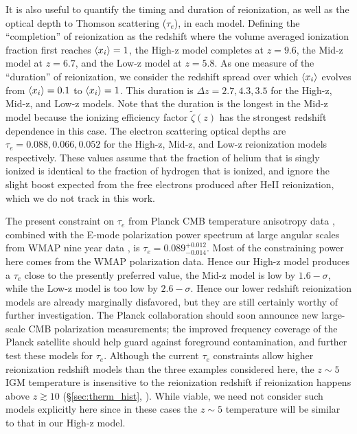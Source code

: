 It is also useful to quantify the timing and duration of reionization, as well as the optical depth to Thomson scattering ($\tau_e$), in each model. 
Defining the ``completion'' of reionization as the redshift where the volume averaged ionization fraction first reaches $\langle x_i \rangle =1$,
the High-z model completes at $z=9.6$,
the Mid-z model at $z=6.7$, and the Low-z model at $z=5.8$. As one measure of the ``duration'' of reionization, we consider the redshift spread over which $\langle x_i \rangle$ evolves from
$\langle x_i \rangle=0.1$ to $\langle x_i \rangle = 1$. This duration is $\Delta z = 2.7, 4.3, 3.5$ for the High-z, Mid-z, and Low-z models. Note that the duration
is the longest in the Mid-z model because the ionizing efficiency factor $\tilde{\zeta}(z)$ has the strongest redshift dependence in this case. 
The electron scattering optical depths are $\tau_e = 0.088, 0.066, 0.052$ for the High-z, Mid-z, and Low-z reionization
models respectively. These values assume that the fraction of helium that is singly ionized is identical to the fraction of hydrogen that
is ionized, and ignore the slight boost expected from the free
electrons produced after HeII reionization, which we do not track in this work. 

The present constraint on $\tau_e$ from Planck CMB temperature anisotropy data \citep{Ade:2013zuv}, combined with the E-mode polarization power spectrum
at large angular scales from WMAP nine year data \citep{Bennett:2012zja}, is $\tau_e = 0.089^{+0.012}_{-0.014}$. Most of the constraining power here
comes from the WMAP polarization data. Hence our High-z model produces a $\tau_e$ close to the presently preferred value, the Mid-z model is low by $1.6-\sigma$, while the Low-z model is too low by $2.6-\sigma$. Hence our lower redshift reionization models are already marginally
disfavored, but they are still certainly worthy of further investigation. The Planck collaboration should soon announce new large-scale CMB
polarization measurements; the improved frequency coverage of the Planck satellite should help guard against foreground contamination, and
further test these models for $\tau_e$.
Although the current $\tau_e$ constraints allow higher reionization redshift models than the three
examples considered here, the $z \sim 5$ IGM temperature is insensitive to the reionization redshift
if reionization happens above $z \gtrsim 10$ (\S \ref{sec:therm_hist}, \citealt{Hui:2003hn}). While viable, we need not consider such models 
explicitly here since in these cases the $z \sim 5$ temperature will be similar to that in our High-z model.


